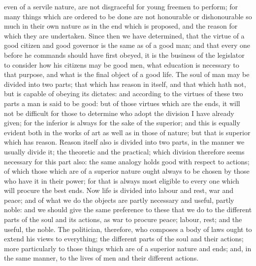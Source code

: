 even of a servile nature, are not disgraceful for young freemen to
perform; for many things which are ordered to be done are not honourable
or dishonourable so much in their own nature as in the end which is
proposed, and the reason for which they are undertaken. Since then we have
determined, that the virtue of a good citizen and good governor is the
same as of a good man; and that every one before he commands should have
first obeyed, it is the business of the legislator to consider how his
citizens may be good men, what education is necessary to that purpose, and
what is the final object of a good life. The soul of man may be divided
into two parts; that which has reason in itself, and that which hath not,
but is capable of obeying its dictates: and according to the virtues of
these two parts a man is said to be good: but of those virtues which are
the ends, it will not be difficult for those to determine who adopt the
division I have already given; for the inferior is always for the sake of
the superior; and this is equally evident both in the works of art as well
as in those of nature; but that is superior which has reason. Reason
itself also is divided into two parts, in the manner we usually divide it;
the theoretic and the practical; which division therefore seems necessary
for this part also: the same analogy holds good with respect to actions;
of which those which are of a superior nature ought always to be chosen by
those who have it in their power; for that is always most eligible to
every one which will procure the best ends. Now life is divided into
labour and rest, war and peace; and of what we do the objects are partly
necessary and useful, partly noble: and we should give the same preference
to these that we do to the different parts of the soul and its actions, as
war to procure peace; labour, rest; and the useful, the noble. The
politician, therefore, who composes a body of laws ought to extend his
views to everything; the different parts of the soul and their actions;
more particularly to those things which are of a superior nature and ends;
and, in the same manner, to the lives of men and their different actions.

